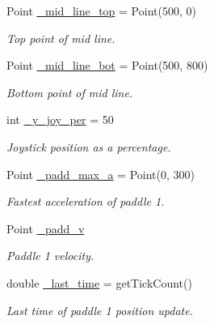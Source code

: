 \begin{DoxyCompactItemize}
\hypertarget{class_c_pong_aebc7a7daabed4411b762020607e900ae}{}\label{class_c_pong_aebc7a7daabed4411b762020607e900ae} 
Point \hyperlink{class_c_pong_aebc7a7daabed4411b762020607e900ae}{\+\_\+mid\+\_\+line\+\_\+top} = Point(500, 0)
\begin{DoxyCompactList}\small\item\em Top point of mid line. \end{DoxyCompactList}\item 
\hypertarget{class_c_pong_a7753cf12ea74d3ddba44b03adfca2d76}{}\label{class_c_pong_a7753cf12ea74d3ddba44b03adfca2d76} 
Point \hyperlink{class_c_pong_a7753cf12ea74d3ddba44b03adfca2d76}{\+\_\+mid\+\_\+line\+\_\+bot} = Point(500, 800)
\begin{DoxyCompactList}\small\item\em Bottom point of mid line. \end{DoxyCompactList}\item 
\hypertarget{class_c_pong_ad94ed35f61910c68742cf7be6570a490}{}\label{class_c_pong_ad94ed35f61910c68742cf7be6570a490} 
int \hyperlink{class_c_pong_ad94ed35f61910c68742cf7be6570a490}{\+\_\+y\+\_\+joy\+\_\+per} = 50
\begin{DoxyCompactList}\small\item\em Joystick position as a percentage. \end{DoxyCompactList}\item 
\hypertarget{class_c_pong_ab9a02d2165381ddb34eaa74d55545ef2}{}\label{class_c_pong_ab9a02d2165381ddb34eaa74d55545ef2} 
Point \hyperlink{class_c_pong_ab9a02d2165381ddb34eaa74d55545ef2}{\+\_\+padd\+\_\+max\+\_\+a} = Point(0, 300)
\begin{DoxyCompactList}\small\item\em Fastest acceleration of paddle 1. \end{DoxyCompactList}\item 
\hypertarget{class_c_pong_a0d72b54cc857af8b886a488b3b4c7e34}{}\label{class_c_pong_a0d72b54cc857af8b886a488b3b4c7e34} 
Point \hyperlink{class_c_pong_a0d72b54cc857af8b886a488b3b4c7e34}{\+\_\+padd\+\_\+v}
\begin{DoxyCompactList}\small\item\em Paddle 1 velocity. \end{DoxyCompactList}\item 
\hypertarget{class_c_pong_a04a60c2697923862d66227917f4ee46d}{}\label{class_c_pong_a04a60c2697923862d66227917f4ee46d} 
double \hyperlink{class_c_pong_a04a60c2697923862d66227917f4ee46d}{\+\_\+last\+\_\+time} = get\+Tick\+Count()
\begin{DoxyCompactList}\small\item\em Last time of paddle 1 position update. \end{DoxyCompactList}\item 

\end{DoxyCompactItemize}
